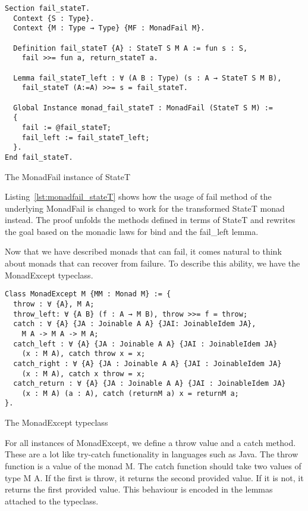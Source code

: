 \begin{listing}
\begin{verbatim}
Section fail_stateT.
  Context {S : Type}.
  Context {M : Type → Type} {MF : MonadFail M}.

  Definition fail_stateT {A} : StateT S M A := fun s : S, 
    fail >>= fun a, return_stateT a.

  Lemma fail_stateT_left : ∀ (A B : Type) (s : A → StateT S M B),
    fail_stateT (A:=A) >>= s = fail_stateT.

  Global Instance monad_fail_stateT : MonadFail (StateT S M) :=
  {
    fail := @fail_stateT;
    fail_left := fail_stateT_left;
  }.
End fail_stateT.
\end{verbatim}
\caption{The MonadFail instance of StateT}
\label{lst:monadfail_stateT}
\end{listing}

Listing~\ref{lst:monadfail_stateT} shows how the usage of fail method 
of the underlying MonadFail is changed to work for the transformed StateT
monad instead. The proof unfolds the methods defined in terms of StateT and
rewrites the goal based on the monadic laws for bind and the fail\_left lemma.

Now that we have described monads that can fail, it comes natural to think
about monads that can recover from failure. To describe this ability, we have
the MonadExcept typeclass.

\begin{listing}
\begin{verbatim}
Class MonadExcept M {MM : Monad M} := {
  throw : ∀ {A}, M A;
  throw_left: ∀ {A B} (f : A → M B), throw >>= f = throw;
  catch : ∀ {A} {JA : Joinable A A} {JAI: JoinableIdem JA}, 
    M A -> M A -> M A;
  catch_left : ∀ {A} {JA : Joinable A A} {JAI : JoinableIdem JA} 
    (x : M A), catch throw x = x;
  catch_right : ∀ {A} {JA : Joinable A A} {JAI : JoinableIdem JA} 
    (x : M A), catch x throw = x;
  catch_return : ∀ {A} {JA : Joinable A A} {JAI : JoinableIdem JA} 
    (x : M A) (a : A), catch (returnM a) x = returnM a;
}.
\end{verbatim}
\caption{The MonadExcept typeclass}
\label{lst:monadexcept}
\end{listing}

For all instances of MonadExcept, we define a throw value and a catch method. 
These are a lot like try-catch functionality in languages such as Java. 
The throw function is a value of the monad M. The catch function
should take two values of type M A. If the first is throw, it returns the
second provided value. If it is not, it returns the first provided value. This
behaviour is encoded in the lemmas attached to the typeclass.

